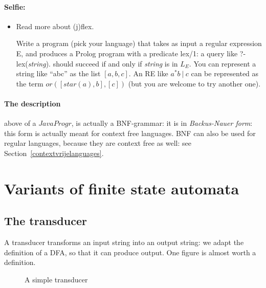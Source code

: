 \paragraph{Selfie:}
\begin{itemize}
\item[]
Read more about (j)flex.

Write a program (pick your language) that takes as input a regular
expression E, and produces a Prolog program with a predicate lex/1: a
query like ?- lex({\em string}). should succeed if and only if {\em
  string} is in $L_E$. You can represent a string like ``abc'' as the
list $[a,b,c]$. An RE like $a^*b~|~c$ can be represented as the term
$or([star(a),b],[c])$ (but you are welcome to try another one).
\end{itemize}

\paragraph{The description} above of a $JavaProgr$, is actually a
BNF-grammar: it is in {\em Backus-Nauer form}: this form is actually
meant for context free languages. BNF can also be used for regular
languages, because they are context free as well: see
Section~\ref{contextvrijelanguages}.

\newpage
\section{Variants of finite state automata}

\subsection{The transducer}


A transducer transforms an input string into an output string: we
adapt the definition of a DFA, so that it can produce output. One
figure is almost worth a definition.

\begin{figure}[h]
\caption{A simple transducer \label{trans1}}
\end{figure}


